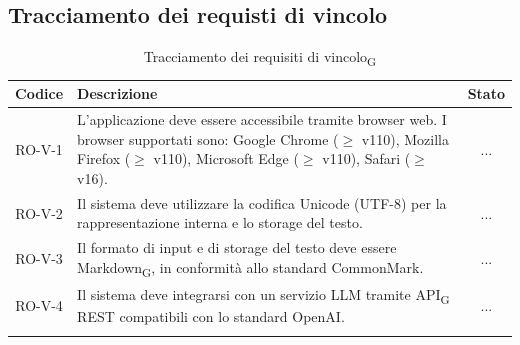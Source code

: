\documentclass[11pt,a4paper]{article}
\newcommand{\gls}[1]{#1\textsubscript{G}}
\begin{document}
\subsection{Tracciamento dei requisti di vincolo}
\begin{longtable}{|c|p{11cm}|c|}
\hline
\textbf{Codice} & \textbf{Descrizione} & \textbf{Stato}\\
\hline
\endhead
RO-V-1 & L'applicazione deve essere accessibile tramite browser web. 
I browser supportati sono: Google Chrome ($\geq$ v110), Mozilla Firefox 
($\geq$ v110), Microsoft Edge ($\geq$ v110), Safari ($\geq$ v16). & ... \\
\hline
RO-V-2 & Il sistema deve utilizzare la codifica Unicode (UTF-8) per la rappresentazione interna e lo storage del testo. & ... \\
\hline
RO-V-3 & Il formato di input e di storage del testo deve essere \gls{Markdown}, in conformità allo standard CommonMark. & ... \\
\hline
RO-V-4 & Il sistema deve integrarsi con un servizio LLM tramite \gls{API} REST compatibili con lo standard OpenAI. & ... \\
\hline
\addlinespace[1em]
\caption{Tracciamento dei \gls{requisiti di vincolo}}
\label{tab:tracciamento_requisiti_vincolo}
\end{longtable}
\end{document}
